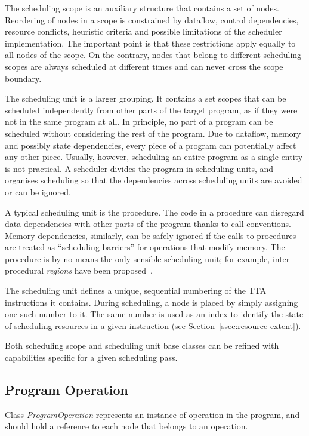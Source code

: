 \documentclass[a4paper,twoside]{tce}
\begin{document}
The scheduling scope is an auxiliary structure that contains a set of nodes.
Reordering of nodes in a scope is constrained by dataflow, control
dependencies, resource conflicts, heuristic criteria and possible
limitations of the scheduler implementation. The important point is that
these restrictions apply equally to all nodes of the scope. On the contrary,
nodes that belong to different scheduling scopes are always scheduled at
different times and can never cross the scope boundary.

The scheduling unit is a larger grouping. It contains a set scopes that can
be scheduled independently from other parts of the target program, as if
they were not in the same program at all. In principle, no part of a program
can be scheduled without considering the rest of the program. Due to
dataflow, memory and possibly state dependencies, every piece of a program
can potentially affect any other piece.
%
Usually, however, scheduling an entire program as a single entity is not
practical. A scheduler divides the program in scheduling units, and
organises scheduling so that the dependencies across scheduling units are
avoided or can be ignored.

A typical scheduling unit is the procedure. The code in a procedure can
disregard data dependencies with other parts of the program thanks to call
conventions. Memory dependencies, similarly, can be safely ignored if the
calls to procedures are treated as ``scheduling barriers'' for operations
that modify memory. The procedure is by no means the only sensible
scheduling unit; for example, inter-procedural \emph{regions} have been
proposed~\cite{Hank96}.

The scheduling unit defines a unique, sequential numbering
%
%
of the TTA instructions it contains. During scheduling, a node is placed by
simply assigning one such number to it. The same number is used as an index
to identify the state of scheduling resources in a given instruction (see
Section~\ref{ssec:resource-extent}).

Both scheduling scope and scheduling unit base classes can be refined with
capabilities specific for a given scheduling pass.

\subsection{Program Operation}

Class \emph{ProgramOperation} represents an instance of operation in the
program, and should hold a reference to each node that belongs to an
operation.
\end{document}
